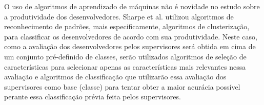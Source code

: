 O uso de algoritmos de aprendizado de máquinas não é novidade no estudo sobre a produtividade dos desenvolvedores. Sharpe et al. \cite{Sharpe2005} utilizou algoritmos de reconhecimento de padrões, mais especificamente, algoritmos de clusterização, para classificar os desenvolvedores de acordo com sua produtividade. Neste caso, como a avaliação dos desenvolvedores pelos supervisores será obtida em cima de um conjunto pré-definido de classes, serão utilizados algoritmos de seleção de características para selecionar apenas as características mais relevantes nessa avaliação e algoritmos de classificação que utilizarão essa avaliação dos supervisores como base (classe) para tentar obter a maior acurácia possível perante essa classificação prévia feita pelos supervisores.


